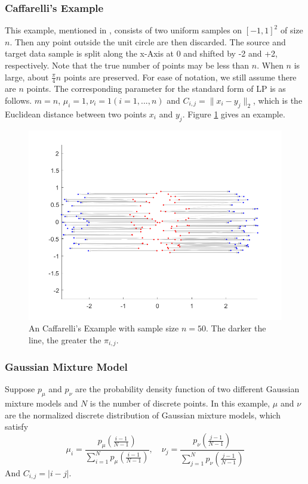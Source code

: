 \subsubsection{Caffarelli's Example}
This example, mentioned in \cite{multiscale}, consists of two uniform samples on $[-1, 1]^2$ of size $n$. Then any point outside the unit circle are then discarded. The source and target data sample is split along the x-Axis at 0 and shifted by -2 and +2, respectively. Note that the true number of points may be less than $n$. When $n$ is large, about $\frac{\pi}{4}n$ points are preserved. For ease of notation, we still assume there are $n$ points. The corresponding parameter for the standard form of LP is as follows. $m = n$, $\mu_i=1, \nu_i=1(i=1, ..., n)$ and $C_{i, j}=\|x_i-y_j\|_2$, which is the Euclidean distance between two points $x_i$ and $y_j$. Figure \ref{caff} gives an example.
\begin{figure}[h]
\centering
\includegraphics[width=12cm]{final/caff1.png}
\caption{An Caffarelli's Example with sample size $n=50$. The darker the line, the greater the $\pi_{i, j}$.}
\label{caff}
\end{figure}

\subsubsection{Gaussian Mixture Model}
Suppose $p_\mu$ and $p_\nu$ are the probability density function of two different Gaussian mixture models and $N$ is the number of discrete points. In this example, $\mu$ and $\nu$ are the normalized discrete distribution of Gaussian mixture models, which satisfy
$$
\mu_i=\frac{p_\mu(\frac{i-1}{N-1})}{\sum_{i=1}^Np_\mu(\frac{i-1}{N-1})}, \quad \nu_j=\frac{p_\nu(\frac{j-1}{N-1})}{\sum_{j=1}^Np_\nu(\frac{j-1}{N-1})}
$$
And $C_{i,j}=|i-j|$. 

